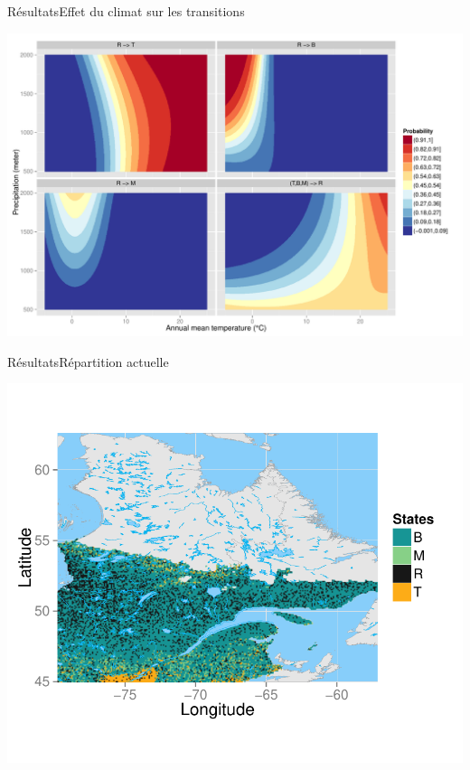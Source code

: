 \documentclass[10pt,aspectratio=149]{beamer}
\begin{document}
   \begin{frame}{Résultats}{Effet du climat sur les transitions}
            \begin{center}
               \includegraphics[height=0.7\textheight]{Figs/Transition_climate_space}
           \end{center}
   \end{frame}


   \begin{frame}{Résultats}{Répartition actuelle}
            \begin{center}
               \includegraphics[height=0.8\textheight]{Figs/STM_map_2000}
           \end{center}
   \end{frame}
\end{document}
